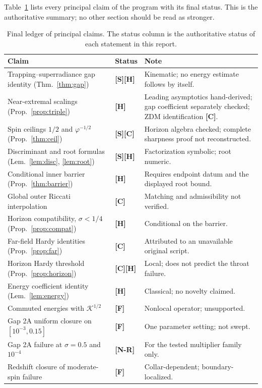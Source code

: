 \documentclass[11pt,a4paper]{article}
\newcommand{\VS}{\textcolor{vs}{\textbf{[S]}}}
\newcommand{\VN}{\textcolor{vn}{\textbf{[N-R]}}}
\newcommand{\VH}{\textcolor{vh}{\textbf{[H]}}}
\newcommand{\CC}{\textcolor{cc}{\textbf{[C]}}}
\newcommand{\FF}{\textcolor{ff}{\textbf{[F]}}}
\theoremstyle{remark}
\theoremstyle{definition}
\begin{document}
Table~\ref{tab:ledger} lists every principal claim of the program with its final status. This is the authoritative summary; no other section should be read as stronger.

\begin{table}[H]
\centering
\caption{Final ledger of principal claims. The status column is the authoritative status of each statement in this report.}
\label{tab:ledger}
\small
\begin{tabular}{@{}p{5.0cm}p{2.2cm}p{7.6cm}@{}}
\toprule
Claim & Status & Note \\
\midrule
Trapping--superradiance gap identity (Thm.~\ref{thm:gap}) & \VS\VH & Kinematic; no energy estimate follows by itself. \\
Near-extremal scalings (Prop.~\ref{prop:triple}) & \VH & Leading asymptotics hand-derived; gap coefficient separately checked; ZDM identification \CC. \\
Spin ceilings $1/2$ and $\varphi^{-1/2}$ (Prop.~\ref{thm:ceil}) & \VS\CC & Horizon algebra checked; complete sharpness proof not reconstructed. \\
Discriminant and root formulas (Lem.~\ref{lem:disc}, \ref{lem:root}) & \VS\VH & Factorization symbolic; root numeric. \\
Conditional inner barrier (Prop.~\ref{thm:barrier}) & \VH & Requires endpoint datum and the displayed root bound. \\
Global outer Riccati interpolation & \CC & Matching and admissibility not verified. \\
Horizon compatibility, $\sigma<1/4$ (Prop.~\ref{prop:compat}) & \VH & Conditional on the barrier. \\
Far-field Hardy identities (Prop.~\ref{prop:far}) & \CC & Attributed to an unavailable original script. \\
Horizon Hardy threshold (Prop.~\ref{prop:horizon}) & \CC\VH & Local; does not predict the throat failure. \\
Energy coefficient identity (Lem.~\ref{lem:energy}) & \VH & Classical; no novelty claimed. \\
Commuted energies with $\mathcal{K}^{1/2}$ & \FF & Nonlocal operator; unsupported. \\
Gap 2A uniform closure on $[10^{-3},0.15]$ & \FF & One parameter setting; not swept. \\
Gap 2A failure at $\sigma=0.5$ and $10^{-4}$ & \VN & For the tested multiplier family only. \\
Redshift closure of moderate-spin failure & \FF & Collar-dependent; boundary-localized. \\

\end{tabular}
\end{table}
\end{document}
